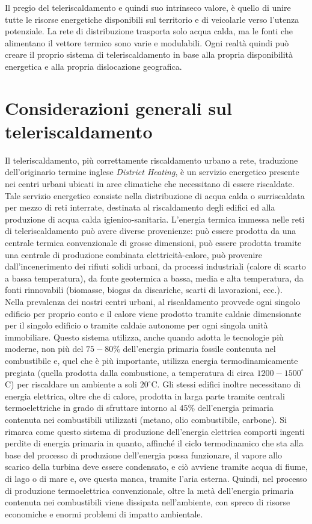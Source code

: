 \documentclass[laurea,oneside,11pt]{USiena_tesiLM}
\begin{document}
 Il pregio del teleriscaldamento e quindi suo intrinseco valore, è quello di unire tutte le risorse energetiche disponibili sul territorio e di veicolarle verso l'utenza potenziale. La rete di distribuzione trasporta solo acqua calda, ma le fonti che alimentano il vettore termico sono varie e modulabili. Ogni realtà quindi può creare il proprio sistema di teleriscaldamento in base alla propria disponibilità energetica e alla propria dislocazione geografica.


\section{Considerazioni generali sul teleriscaldamento}
Il teleriscaldamento, più correttamente riscaldamento urbano a rete, traduzione dell'originario termine inglese \textit{District Heating}, è un servizio energetico presente nei centri urbani ubicati in aree climatiche che necessitano di essere riscaldate.
Tale servizio energetico consiste nella distribuzione di acqua calda o surriscaldata per mezzo di reti interrate, destinata al riscaldamento degli edifici ed alla produzione di acqua calda igienico-sanitaria.
L'energia termica immessa nelle reti di teleriscaldamento può avere diverse provenienze: può essere prodotta da una centrale termica convenzionale di grosse dimensioni, può essere prodotta tramite una centrale di produzione combinata elettricità-calore, può provenire dall'incenerimento dei rifiuti solidi urbani, da processi industriali (calore di scarto a bassa temperatura), da fonte geotermica a bassa, media e alta temperatura, da fonti rinnovabili (biomasse, biogas da discariche, scarti di lavorazioni, ecc.).\\

Nella prevalenza dei nostri centri urbani, al riscaldamento provvede ogni singolo edificio per proprio conto e il calore viene prodotto tramite caldaie dimensionate per il singolo edificio o tramite caldaie autonome per ogni singola unità immobiliare.
Questo sistema utilizza, anche quando adotta le tecnologie più moderne, non più del $75-80\%$ dell'energia primaria fossile contenuta nel combustibile e, quel che è più importante, utilizza energia termodinamicamente pregiata (quella prodotta dalla combustione, a temperatura di circa $1200-1500 ^{\circ}$C) per riscaldare un ambiente a soli $20 ^{\circ}$C.
Gli stessi edifici inoltre necessitano di energia elettrica, oltre che di calore, prodotta in larga parte tramite centrali termoelettriche in grado di sfruttare intorno al $45\%$ dell'energia primaria contenuta nei combustibili utilizzati (metano, olio combustibile, carbone).
Si rimarca come questo sistema di produzione dell'energia elettrica comporti ingenti perdite di energia primaria in quanto, affinché il ciclo termodinamico che sta alla base del processo di produzione dell'energia possa funzionare, il vapore allo scarico della turbina deve essere condensato, e ciò avviene tramite acqua di fiume, di lago o di mare e, ove questa manca, tramite l'aria esterna. Quindi, nel processo di produzione termoelettrica convenzionale, oltre la metà dell'energia primaria contenuta nei combustibili viene dissipata nell'ambiente, con spreco di risorse economiche e enormi problemi di impatto ambientale.\\
\end{document}

